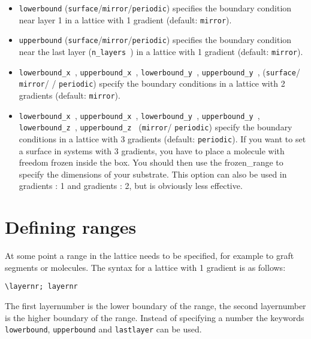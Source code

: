 \documentclass{article}
\begin{document}
\begin{itemize}

\item {\tt lowerbound} ({\tt surface}/{\tt mirror}/{\tt periodic}) specifies the boundary condition near layer 1 in a lattice with 1 gradient (default: {\tt mirror}).

\item {\tt upperbound} ({\tt surface}/{\tt mirror}/{\tt periodic}) specifies the boundary condition near the last layer ({\tt n\_layers }) in a lattice with 1 gradient (default: {\tt mirror}).

\item {\tt lowerbound\_x }, {\tt upperbound\_x }, {\tt lowerbound\_y }, {\tt upperbound\_y }, ({\tt surface}/ {\tt mirror}/ / {\tt periodic}) specify the boundary conditions in a lattice with 2 gradients (default: {\tt mirror}).

\item {\tt lowerbound\_x }, {\tt upperbound\_x }, {\tt lowerbound\_y }, {\tt upperbound\_y }, {\tt lowerbound\_z }, {\tt upperbound\_z } ({\tt mirror}/ {\tt periodic}) specify the boundary conditions in a lattice with 3 gradients (default: {\tt periodic}). If you want to set a surface in systems with 3 gradients, you have to place a molecule with freedom frozen inside the box. You should then use the frozen\_range to specify the dimensions of your substrate. This option can also be used in gradients : 1 and gradients : 2, but is obviously less effective.

\end{itemize}

\section{Defining ranges}
\label{sec:ranges}

At some point a range in the lattice needs to be specified, for example to graft segments or molecules. The syntax for a lattice with 1 gradient is as follows: 
\begin{verbatim}
\layernr; layernr
\end{verbatim}
The first layernumber is the lower boundary of the range, the second layernumber is the higher boundary of the range. Instead of specifying a number the keywords {\tt lowerbound}, {\tt upperbound} and {\tt lastlayer} can be used. 
\end{document}
